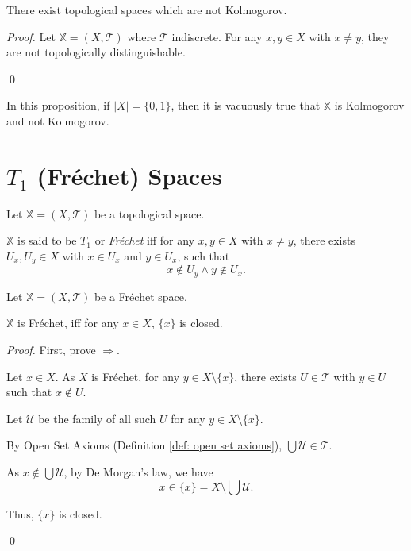 \begin{proposition}
	There exist topological spaces which are not Kolmogorov.
	
	\begin{proof}
		Let $\mathbb X = (X, \mathcal T)$ where $\mathcal T$ indiscrete. For any $x,y \in X$ with $x \ne y$, they are not topologically distinguishable.

		\qed
	\end{proof}
\end{proposition}


\begin{note}
	In this proposition, if $|X| = \{0,1\}$, then it is vacuously true that $\mathbb X$ is Kolmogorov and not Kolmogorov.
\end{note}


\section{$T_1$ (Fr\'echet) Spaces}


\begin{definition}
	\label{def: T1 space}
	Let $\mathbb X = (X, \mathcal T)$ be a topological space.
	
	$\mathbb X$ is said to be $T_1$ or \textit{Fr\'echet} iff for any $x, y \in X$ with $x \ne y$, there exists $U_x, U_y \in X$ with $x \in U_x$ and $y \in U_x$, such that
	$$
	x \notin U_y \land y \notin U_x.
	$$
\end{definition}




\begin{proposition}
	\label{prop: T1 iff monotones are closed}
	Let $\mathbb X = (X, \mathcal T)$ be a Fr\'echet space.
	
	$\mathbb X$ is Fr\'echet, iff for any $x \in X$, $\{x\}$ is closed.
	
	\begin{proof}
		First, prove $\Rightarrow$.
		
		Let $x \in X$.
		As $X$ is Fr\'echet, for any $y \in X \setminus \{x\}$, there exists $U \in \mathcal T$ with $y \in U$ such that $x \notin U$.
		
		Let $\mathcal U$ be the family of all such $U$ for any $y \in X \setminus \{x\}$.
		
		By Open Set Axioms (Definition \ref{def: open set axioms}), $\bigcup \mathcal U \in \mathcal T$.
		
		As $x \notin \bigcup \mathcal U$, by De Morgan's law, we have
		$$
		x \in \{x\} = X \setminus \bigcup \mathcal U.
		$$
		
		Thus, $\{x\}$ is closed.
		
		\qed
	\end{proof}
\end{proposition}


